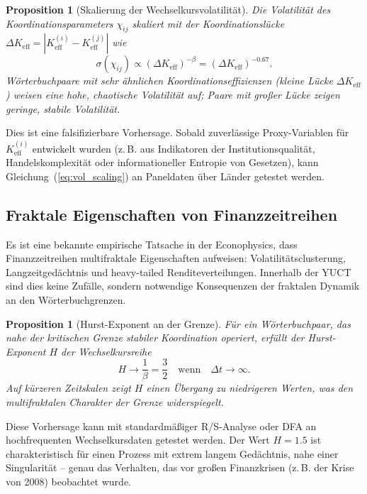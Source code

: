 \documentclass[12pt,a4paper]{article}
\newtheorem{proposition}[theorem]{Proposition}
\theoremstyle{remark}
\begin{document}
	\begin{proposition}[Skalierung der Wechselkursvolatilität]
		Die Volatilität des Koordinationsparameters \(\chi_{ij}\) skaliert mit der Koordinationslücke \(\Delta K_{\mathrm{eff}} = |K_{\mathrm{eff}}^{(i)} - K_{\mathrm{eff}}^{(j)}|\) wie
		\begin{equation}
			\sigma(\chi_{ij}) \propto (\Delta K_{\mathrm{eff}})^{-\beta} = (\Delta K_{\mathrm{eff}})^{-0.67}.
			\label{eq:vol_scaling}
		\end{equation}
		Wörterbuchpaare mit sehr ähnlichen Koordinationseffizienzen (kleine Lücke \(\Delta K_{\mathrm{eff}}\)) weisen eine hohe, chaotische Volatilität auf; Paare mit großer Lücke zeigen geringe, stabile Volatilität.
	\end{proposition}
	
	Dies ist eine falsifizierbare Vorhersage. Sobald zuverlässige Proxy-Variablen für \(K_{\mathrm{eff}}^{(i)}\) entwickelt wurden (z. B. aus Indikatoren der Institutionsqualität, Handelskomplexität oder informationeller Entropie von Gesetzen), kann Gleichung~(\ref{eq:vol_scaling}) an Paneldaten über Länder getestet werden.
	
	\subsection{Fraktale Eigenschaften von Finanzzeitreihen}
	
	Es ist eine bekannte empirische Tatsache in der Econophysics, dass Finanzzeitreihen multifraktale Eigenschaften aufweisen: Volatilitätsclusterung, Langzeitgedächtnis und heavy-tailed Renditeverteilungen. Innerhalb der YUCT sind dies keine Zufälle, sondern notwendige Konsequenzen der fraktalen Dynamik an den Wörterbuchgrenzen.
	
	\begin{proposition}[Hurst-Exponent an der Grenze]
		Für ein Wörterbuchpaar, das nahe der kritischen Grenze stabiler Koordination operiert, erfüllt der Hurst-Exponent \(H\) der Wechselkursreihe
		\begin{equation}
			H \to \frac{1}{\beta} = \frac{3}{2} \quad \text{wenn} \quad \Delta t \to \infty.
			\label{eq:hurst}
		\end{equation}
		Auf kürzeren Zeitskalen zeigt \(H\) einen Übergang zu niedrigeren Werten, was den multifraktalen Charakter der Grenze widerspiegelt.
	\end{proposition}
	
	Diese Vorhersage kann mit standardmäßiger R/S-Analyse oder DFA an hochfrequenten Wechselkursdaten getestet werden. Der Wert \(H = 1.5\) ist charakteristisch für einen Prozess mit extrem langem Gedächtnis, nahe einer Singularität – genau das Verhalten, das vor großen Finanzkrisen (z. B. der Krise von 2008) beobachtet wurde.
	
\end{document}
